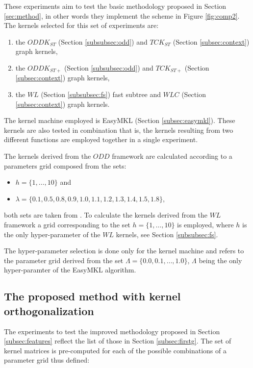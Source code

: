 These experiments aim to test the basic methodology proposed in Section \ref{sec:method},
in other words they implement the scheme in Figure \ref{fig:comp2}.
The kernels selected for this set of experiments are:
\begin{enumerate}
    \item the $ODDK_{ST}$ (Section \ref{subsubsec:odd}) and $TCK_{ST}$ (Section \ref{subsec:context}) graph kernels,
    \item the $ODDK_{ST+}$ (Section \ref{subsubsec:odd}) and $TCK_{ST+}$ (Section \ref{subsec:context}) graph kernels,
    \item the $WL$ (Section \ref{subsubsec:fs}) fast subtree and $WLC$ (Section \ref{subsec:context}) graph kernels.
\end{enumerate}
The kernel machine employed is EasyMKL (Section \ref{subsec:easymkl}).
These kernels are also tested in combination that is, the kernels resulting from
two different functions are employed together in a single experiment.

The kernels derived from the $ODD$ framework are calculated according to a parameters grid
composed from the sets:
\begin{itemize}
    \item $h=\{1,\dots,10\}$ and 
    \item $\lambda=\{0.1, 0.5, 0.8, 0.9, 1.0, 1.1, 1.2, 1.3, 1.4, 1.5, 1.8\}$,
\end{itemize}
both sets are taken from \cite{rtesselli}.
To calculate the kernels derived from the $WL$ framework a grid corresponding to
the set $h=\{1,\dots,10\}$ is employed, where $h$ is the only hyper-parameter of
the $WL$ kernels, see Section \ref{subsubsec:fs}.

The hyper-parameter selection is done only for the kernel machine and refers
to the parameter grid derived from the set $\Lambda=\{0.0, 0.1,\dots,1.0\}$, $\Lambda$
being the only hyper-paramter of the EasyMKL algorithm.

\subsection{The proposed method with kernel orthogonalization}
\label{subsec:secondg}

The experiments to test the improved methodology proposed in Section \ref{subsec:features}
reflect the list of those in Section \ref{subsec:firstg}.
The set of kernel matrices is pre-computed for each of the possible combinations
of a parameter grid thus defined:

